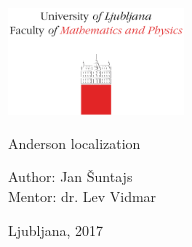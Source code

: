 \documentclass[10pt,a4paper]{article}
\begin{document}


\begin{center}

\includegraphics[width=0.35\textwidth]{logo_fmf_uni-lj_en.pdf}\\[8ex] 

\vspace{3mm}


\vspace{2 cm}

{ \Large }Anderson localization\\             
\vspace{3cm}


{\large Author: Jan Šuntajs\\
\large Mentor: dr. Lev Vidmar \\
\vspace{2cm}



Ljubljana, 2017}
\vfill
\begin{abstract}


\end{abstract}

\end{center}

\cleardoublepage

\thispagestyle{empty}


\clearpage
\pagestyle{fancy}
\fancyhf{}
\cfoot{\thepage}
\setcounter{page}{1}
\end{document}

